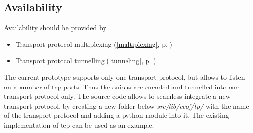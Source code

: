 \subsection{Availability}
Availability should be provided by
\begin{itemize}
\item Transport protocol multiplexing (\ref{multiplexing}, p. \pageref{multiplexing})
\item Transport protocol tunnelling (\ref{tunneling}, p. \pageref{tunneling})
\end{itemize}
The current prototype supports only one transport protocol, but allows to listen on
a number of tcp ports. Thus the onions are encoded and tunnelled into
one transport protocol only. The source code allows to seamless integrate a new
transport protocol, by creating a new folder below
\textit{src/lib/ceof/tp/} with the name of the transport protocol and adding
a python module into it. The existing implementation of tcp can be used
as an example.
